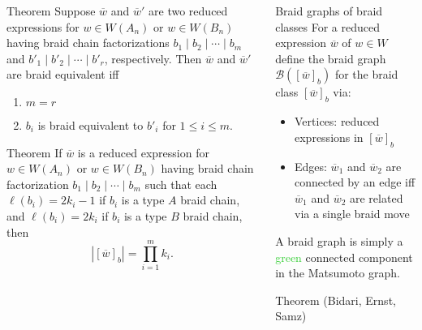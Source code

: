 \documentclass[final]{beamer}
\newcommand{\w}{\overline{w}}
\begin{document}
\begin{frame}{}
\begin{columns}[T]
\begin{column}{.33\linewidth}
\begin{block}{Theorem}
Suppose $\w$ and $\w'$ are two reduced expressions for $w \in W(A_n)$ or $w \in W(B_n)$ having braid chain factorizations $b_1\mid b_2\mid \cdots\mid b_m$ and $b'_1\mid b'_2\mid\cdots\mid b'_r$, respectively. Then $\w$ and $\w'$ are braid equivalent iff
\vspace{.2em}
\begin{enumerate}
\item $m=r$
\item $b_i$ is braid equivalent to $b'_i$ for $1\leq i\leq m$.
\end{enumerate}
\end{block}


\begin{block}{Theorem}
If $\w$ is a reduced expression for $w \in W(A_n)$ or $w \in W(B_n)$ having braid chain factorization $b_1 \mid b_2 \mid \cdots \mid b_m$ such that each $\ell(b_i)=2k_i-1$ if $b_i$ is a type $A$ braid chain, and $\ell(b_i)=2k_i$ if $b_i$ is a type $B$ braid chain, then
\[
|[\w]_b|=\prod_{i=1}^m k_i.
\]
\end{block}

\end{column}


\begin{column}{.33\linewidth}


\begin{block}{Braid graphs of braid classes}
\vspace{.3em}
For a reduced expression $\w$ of $w \in W$ define the \alert{braid graph} $\mathcal{B}([\w]_b)$ for the braid class $[\w]_b$ via:
\begin{itemize}
\item Vertices: reduced expressions in $[\w]_b$
\item Edges: $\w_1$ and $\w_2$ are connected by an edge iff $\w_1$ and $\w_2$ are related via a single braid move
\end{itemize}
A braid graph is simply a \textcolor{limegreen}{green} connected component in the Matsumoto graph.
\end{block}


\begin{block}{Theorem (Bidari, Ernst, Samz)}


\end{block}
\end{column}
\end{columns}
\end{frame}
\end{document}
